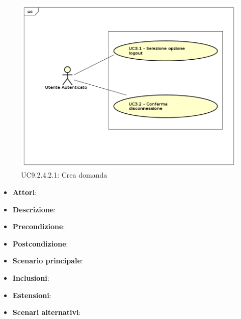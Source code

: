 				\label{UC9.2.4.2.1}
				\begin{figure}[h]
					\centering
				\includegraphics[scale=0.7,keepaspectratio]{UML/UC9.png}
					\caption{UC9.2.4.2.1: Crea domanda}
				\end{figure}
				\FloatBarrier
				\begin{itemize}
					\item \textbf{Attori}: 
					\item \textbf{Descrizione}: 
					\item \textbf{Precondizione}: 
					\item \textbf{Postcondizione}: 
					\item \textbf{Scenario principale}:
					\item \textbf{Inclusioni}:
					\item \textbf{Estensioni}:
					\item \textbf{Scenari alternativi}:
				\end{itemize}
				
